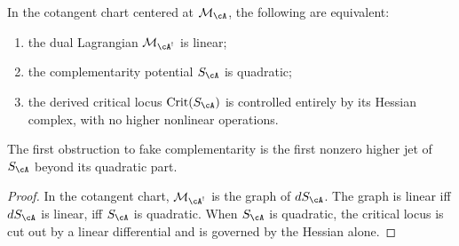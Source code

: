 \begin{proposition}
\label{prop:fake-complementarity-criterion}
\ClaimStatusProvedHere
In the cotangent chart centered at $\mathcal{M}_{\cA}$, the
following are equivalent:
\begin{enumerate}[label=\textup{(\roman*)}]
\item the dual Lagrangian $\mathcal{M}_{\cA^!}$ is linear;
\item the complementarity potential $S_{\cA}$ is quadratic;
\item the derived critical locus $\operatorname{Crit}(S_{\cA})$
is controlled entirely by its Hessian complex, with no higher
nonlinear operations.
\end{enumerate}
The first obstruction to fake complementarity is the first nonzero
higher jet of $S_{\cA}$ beyond its quadratic part.
\end{proposition}

\begin{proof}
In the cotangent chart, $\mathcal{M}_{\cA^!}$ is the graph of
$dS_{\cA}$. The graph is linear iff $dS_{\cA}$ is linear,
iff $S_{\cA}$ is quadratic. When $S_{\cA}$ is quadratic, the
critical locus is cut out by a linear differential and is
governed by the Hessian alone.
\end{proof}

